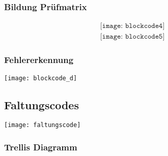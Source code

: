 \subsubsection{Bildung Prüfmatrix}
\begin{align*}
    \texttt{[image: blockcode4]}
\end{align*}
\begin{align*}
    \texttt{[image: blockcode5]}
\end{align*}
\subsubsection{Fehlererkennung}
\begin{center}
	\texttt{[image: blockcode\_d]}
\end{center}

\subsection{Faltungscodes}
\texttt{[image: faltungscode]}
\subsubsection{Trellis Diagramm}